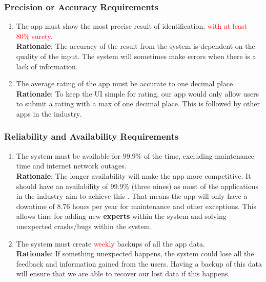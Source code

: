 \subsubsection{Precision or Accuracy Requirements}
\label{ssub:precision_or_accuracy_requirements}
\begin{enumerate}[{PR-PA}1. ]
	\item The app must show the most precise result of identification\textcolor{red}{, with at least 80\% surety.}
	\\ \textbf{Rationale}: The accuracy of the result from the system is dependent on the quality of the input. The system will sometimes make errors when there is a lack of information.
	\item The average rating of the app must be accurate to one decimal place.
	\\ \textbf{Rationale}: To keep the UI simple for rating, our app would only allow users to submit a rating with a max of one decimal place. This is followed by other apps in the industry. 
\end{enumerate}

\subsubsection{Reliability and Availability Requirements}
\label{ssub:reliability_and_availability_requirements}
\begin{enumerate}[{PR-RA}1. ]
	\item The system must be available for 99.9\% of the time, excluding maintenance time and internet network outages.
	\\ \textbf{Rationale}: The longer availability will make the app more competitive. It should have an availability of 99.9\% (three nines) as most of the applications in the industry aim to achieve this \cite{Britannica2025_WritingSystems}. That means the app will only have a downtime of 8.76 hours per year for maintenance and other exceptions. This allows time for adding new \textbf{experts} within the system and solving unexpected crashs/bugs within the system.
	\item The system must create \textcolor{red}{weekly} backups of all the app data.
	\\ \textbf{Rationale}: If something unexpected happens, the system could lose all the feedback and information gained from the users. Having a backup of this data will ensure that we are able to recover our lost data if this happens.
\end{enumerate}


